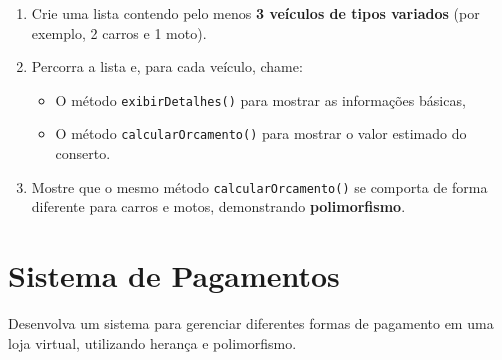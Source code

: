 \documentclass{article}
\begin{document}
\begin{enumerate}
    \item Crie uma lista contendo pelo menos \textbf{3 veículos de tipos variados} (por exemplo, 2 carros e 1 moto).

    \item Percorra a lista e, para cada veículo, chame:
          \begin{itemize}
              \item O método \texttt{exibirDetalhes()} para mostrar as informações básicas,
              \item O método \texttt{calcularOrcamento()} para mostrar o valor estimado do conserto.
          \end{itemize}

    \item Mostre que o mesmo método \texttt{calcularOrcamento()} se comporta de forma diferente para carros e motos, demonstrando \textbf{polimorfismo}.
\end{enumerate}

\section{Sistema de Pagamentos}

Desenvolva um sistema para gerenciar diferentes formas de pagamento em uma loja virtual, utilizando herança e polimorfismo.
\end{document}
